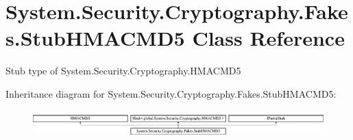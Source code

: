 \hypertarget{class_system_1_1_security_1_1_cryptography_1_1_fakes_1_1_stub_h_m_a_c_m_d5}{\section{System.\-Security.\-Cryptography.\-Fakes.\-Stub\-H\-M\-A\-C\-M\-D5 Class Reference}
\label{class_system_1_1_security_1_1_cryptography_1_1_fakes_1_1_stub_h_m_a_c_m_d5}
}


Stub type of System.\-Security.\-Cryptography.\-H\-M\-A\-C\-M\-D5 


Inheritance diagram for System.\-Security.\-Cryptography.\-Fakes.\-Stub\-H\-M\-A\-C\-M\-D5\-:\begin{figure}[H]
\begin{center}
\leavevmode
\includegraphics[height=1.060606cm]{class_system_1_1_security_1_1_cryptography_1_1_fakes_1_1_stub_h_m_a_c_m_d5}
\end{center}
\end{figure}
